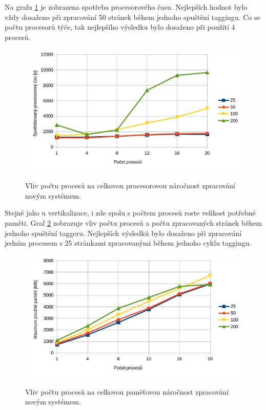 Na grafu \ref{graph:graph_tagging_procesorovy_cas} je zobrazena spotřeba procesorového času.
Nejlepších hodnot bylo vždy dosaženo při zpracování 50 stránek během jednoho spuštění taggingu.
Co se počtu procesorů týče, tak nejlepšího výsledku bylo dosaženo při použití 4 procesů.

\begin{figure}[H]
    \begin{center}
        \label{graph:graph_tagging_procesorovy_cas}
        \includegraphics[width=1.0\textwidth]{obrazky-figures/graph_tagging_procesorovy_cas.png}
        \caption{Vliv počtu procesů na celkovou procesorovou náročnost zpracování novým systémem.}
    \end{center}
\end{figure}

Stejně jako u vertikalizace, i zde spolu s počtem procesů roste velikost potřebné paměti.
Graf \ref{graph:graph_tagging_pamet} zobrazuje vliv počtu procesů a počtu zpracovaných stránek
během jednoho spuštění taggeru. Nejlepších výsledků bylo dosaženo při zpracování jedním procesem
s 25 stránkami zpracovanými během jednoho cyklu taggingu.

\begin{figure}[H]
    \begin{center}
        \label{graph:graph_tagging_pamet}
        \includegraphics[width=1.0\textwidth]{obrazky-figures/graph_tagging_pamet.png}
        \caption{Vliv počtu procesů na celkovou paměťovou náročnost zpracování novým systémem.}
    \end{center}
\end{figure}

